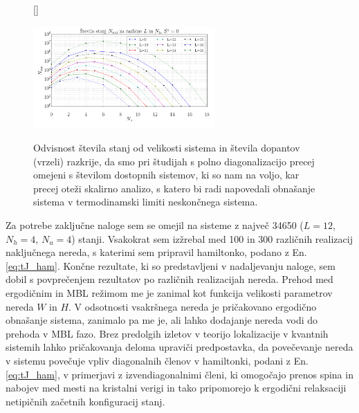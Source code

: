 \documentclass[10pt,a4paper]{article}
\begin{document}
\begin{figure}[H]
[\FBwidth]
{\caption{Odvisnost števila stanj od velikosti sistema in števila dopantov (vrzeli) razkrije, da smo pri študijah s polno diagonalizacijo precej omejeni s številom dostopnih sistemov, ki so nam na voljo, kar precej oteži skalirno analizo, s katero bi radi napovedali obnašanje sistema v termodinamski limiti neskončnega sistema. }\label{fig:tJ_num_states}}
{\includegraphics[width=0.62\textwidth]{tJ_num_states.pdf}}
\end{figure}
Za potrebe zaključne naloge sem se omejil na sisteme z največ 34650 ($L=12$, $N_h=4$, $N_u=4$) stanji. Vsakokrat sem izžrebal med 100 in 300 različnih realizacij naključnega nereda, s katerimi sem pripravil hamiltonko, podano z En. \eqref{eq:tJ_ham}. Končne rezultate, ki so predstavljeni v nadaljevanju naloge, sem dobil s povprečenjem rezultatov po različnih realizacijah nereda. Prehod med ergodičnim in MBL režimom me je zanimal kot funkcija velikosti parametrov nereda $W$ in $H$. V odsotnosti vsakršnega nereda je pričakovano ergodično obnašanje sistema, zanimalo pa me je, ali lahko dodajanje nereda vodi do prehoda v MBL fazo. Brez predolgih izletov v teorijo lokalizacije v kvantnih sistemih lahko pričakovanja deloma upraviči predpostavka, da povečevanje nereda v sistemu povečuje vpliv diagonalnih členov v hamiltonki, podani z En. \eqref{eq:tJ_ham}, v primerjavi z izvendiagonalnimi členi, ki omogočajo prenos spina in nabojev med mesti na kristalni verigi in tako pripomorejo k ergodični relaksaciji netipičnih začetnih konfiguracij stanj.  
\end{document}
